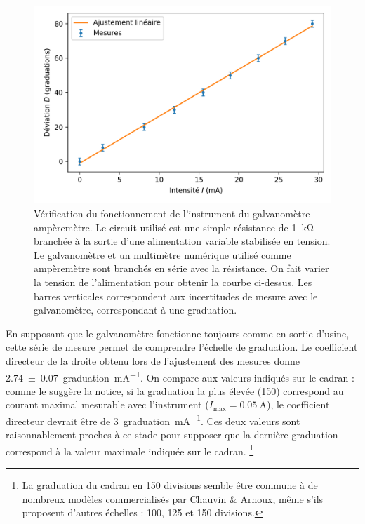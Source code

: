 \documentclass[12pt,a4paper,fleqn]{article}
\begin{document}
\begin{figure}[htbp]
    \center
    \includegraphics[scale=1]{images/mesure.png}
    \caption{Vérification du fonctionnement de l'instrument du galvanomètre ampèremètre.
    Le circuit utilisé est une simple résistance de \SI{1}{\kilo\ohm} branchée à la sortie d'une alimentation variable stabilisée en tension.
    Le galvanomètre et un multimètre numérique utilisé comme ampèremètre sont branchés en série avec la résistance.
    On fait varier la tension de l'alimentation pour obtenir la courbe ci-dessus.
    Les barres verticales correspondent aux incertitudes de mesure avec le galvanomètre, correspondant à une graduation.}
    \label{fig:galva_amp_mes}
\end{figure}

En supposant que le galvanomètre fonctionne toujours comme en sortie d'usine, cette série de mesure permet de comprendre l'échelle de graduation.
Le coefficient directeur de la droite obtenu lors de l'ajustement des mesures donne \SI{2.74(7)}{graduation\per\milli\ampere}.
On compare aux valeurs indiqués sur le cadran : comme le suggère la notice, si la graduation la plus élevée (150) correspond au courant maximal mesurable avec l'instrument ($I_\mathrm{max}=\SI{0.05}{\ampere}$), le coefficient directeur devrait être de \SI{3}{graduation\per\milli\ampere}.
Ces deux valeurs sont raisonnablement proches à ce stade pour supposer que la dernière graduation correspond à la valeur maximale indiquée sur le cadran.
\footnote{La graduation du cadran en 150 divisions semble être commune à de nombreux modèles commercialisés par Chauvin \& Arnoux, même s'ils proposent d'autres échelles : 100, 125 et 150 divisions.}
\end{document}

